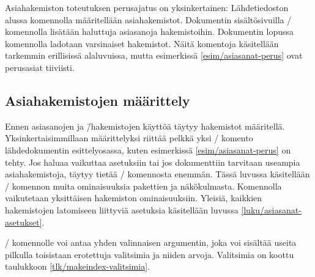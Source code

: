 Asiahakemiston toteutuksen perusajatus on yksinkertainen: Lähdetiedoston
alussa komennolla  määritellään asiahakemistot.
Dokumentin sisältösivuilla \-/ komennolla lisätään
haluttuja asiasanoja hakemistoihin. Dokumentin lopussa komennolla
 ladotaan varsinaiset hakemistot. Näitä komentoja
käsitellään tarkemmin erillisissä alaluvuissa, mutta esimerkissä
\ref{esim/asiasanat-perus} ovat perusasiat tiiviisti.

\subsection{Asiahakemistojen määrittely}
\label{luku/asiasanat-määrittely}

Ennen asiasanojen ja \=/hakemistojen käyttöä täytyy hakemistot
määritellä. Yksinkertaisimmillaan määrittelyksi riittää pelkkä yksi
\-/ komento lähdedokumentin esittelyosassa, kuten
esimerkissä \ref{esim/asiasanat-perus} on tehty. Jos haluaa vaikuttaa
asetuksiin tai jos dokumenttiin tarvitaan useampia asiahakemistoja,
täytyy tietää \-/ komennosta enemmän. Tässä luvussa
käsitellään \-/ komennon muita ominaisuuksia
pakettien  ja  näkökulmasta.
Komennolla vaikutetaan yksittäisen hakemiston ominaisuuksiin. Yleisiä,
kaikkien hakemistojen latomiseen liittyviä asetuksia käsitellään luvussa
\ref{luku/asiasanat-asetukset}.


\-/ komennolle voi antaa yhden valinnaisen
argumentin, joka voi sisältää useita pilkulla toisistaan erotettuja
valitsimia ja niiden arvoja. Valitsimia on koottu taulukkoon
\ref{tlk/makeindex-valitsimia}.

